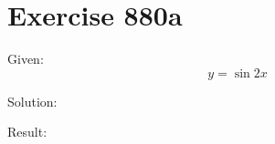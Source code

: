 \documentclass[a4paper, 10pt]{scrartcl}
\begin{document}
\section{Exercise 880a}

Given:
\[
y = \sin{2}{x}
\]

Solution:

Result:
\end{document}
